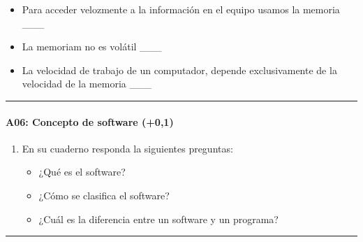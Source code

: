 \documentclass[letterpaper,10pt,spanish]{sphinxmanual}
\begin{document}
\begin{enumerate}
\begin{itemize}
\item {} 
\sphinxAtStartPar
Para acceder velozmente a la información en el equipo usamos la memoria  \_\_\_

\item {} 
\sphinxAtStartPar
La memoriam  no es volátil \_\_\_

\item {} 
\sphinxAtStartPar
La velocidad de trabajo de un computador, depende exclusivamente de la velocidad de la memoria  \_\_\_

\end{itemize}

\end{enumerate}


\bigskip\hrule\bigskip



\paragraph{A06: Concepto de software (+0,1)}
\label{\detokenize{cursos/ofimatica11/periodo01/G01:a06-concepto-de-software-0-1}}
\sphinxAtStartPar
{}
\begin{enumerate}
%
\item {} 
\sphinxAtStartPar
En su cuaderno responda la siguientes preguntas:
\begin{itemize}
\item {} 
\sphinxAtStartPar
¿Qué es el software?

\item {} 
\sphinxAtStartPar
¿Cómo se clasifica el software?

\item {} 
\sphinxAtStartPar
¿Cuál es la diferencia entre un software y un programa?

\end{itemize}

\end{enumerate}


\bigskip\hrule\bigskip
\end{document}
